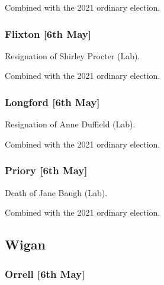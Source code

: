 \documentclass[a4paper,openany]{book}
\begin{document}
\begin{resultsiii}
Combined with the 2021 ordinary election.

\subsubsection*{Flixton \hspace*{\fill}\nolinebreak[1]%
	\enspace\hspace*{\fill}
	[6th May]}


Resignation of Shirley Procter (Lab).

Combined with the 2021 ordinary election.

\subsubsection*{Longford \hspace*{\fill}\nolinebreak[1]%
	\enspace\hspace*{\fill}
	[6th May]}


Resignation of Anne Duffield (Lab).

Combined with the 2021 ordinary election.

\subsubsection*{Priory \hspace*{\fill}\nolinebreak[1]%
	\enspace\hspace*{\fill}
	[6th May]}


Death of Jane Baugh (Lab).

Combined with the 2021 ordinary election.

\subsection*{Wigan}

\subsubsection*{Orrell \hspace*{\fill}\nolinebreak[1]%
	\enspace\hspace*{\fill}
	[6th May]}


\end{resultsiii}
\end{document}
